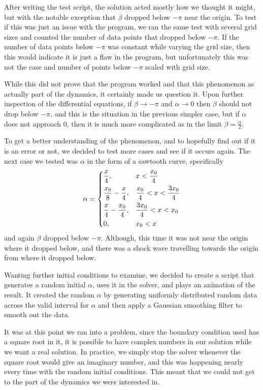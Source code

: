 \documentclass[12pt]{article}
\begin{document}
After writing the test script, the solution acted mostly how we thought it might, but
with the notable exception that $\beta$ dropped below $-\pi$ near the origin. To test if
this was just an issue with the program, we ran the same test with several grid sizes
and counted the number of data points that dropped below $-\pi$. If the number of data
points below $-\pi$ was constant while varying the grid size, then this would indicate
it is just a flaw in the program, but unfortunately this was not the case and number of
points below $-\pi$ scaled with grid size.

While this did not prove that the program worked and that this phenomenon as actually
part of the dynamics, it certainly made us question it. Upon further inspection of the
differential equations, if $\beta\to-\pi$ and $\alpha\to0$ then $\beta$ should not drop
below $-\pi$, and this is the situation in the previous simpler case, but if $\alpha$
does not approach $0$, then it is much more complicated as in the limit $\dot{\beta} =
\frac{\alpha}{2}$.

To get a better understanding of the phenomenon, and to hopefully find out if it is an
error or not, we decided to test more cases and see if it occurs again. The next case we
tested was $\alpha$ in the form of a sawtooth curve, specifically
\[ \alpha = \begin{dcases}
    \frac{x}{4}, & x < \frac{x_0}{4} \\
    \frac{x_0}{8} - \frac{x}{4}, & \frac{x_0}{4} < x < \frac{3x_0}{4} \\
    \frac{x}{4} - \frac{x_0}{4}, & \frac{3x_0}{4} < x < x_0 \\
    0, & x_0 < x
\end{dcases} \]
and again $\beta$ dropped below $-\pi$. Although, this time it was not near the origin
where it dropped below, and there was a shock wave travelling towards the origin from
where it dropped below.

Wanting further initial conditions to examine, we decided to create a script that
generates a random initial $\alpha$, uses it in the solver, and plays an animation of
the result. It created the random $\alpha$ by generating uniformly distributed random
data across the valid interval for $\alpha$ and then apply a Gaussian smoothing filter
to smooth out the data.

It was at this point we ran into a problem, since the boundary condition used has a
square root in it, it is possible to have complex numbers in our solution while we want
a real solution. In practice, we simply stop the solver whenever the square root would
give an imaginary number, and this was happening nearly every time with the random
initial conditions. This meant that we could not get to the part of the dynamics we were
interested in.
\end{document}
